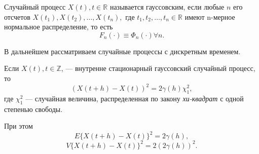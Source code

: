 \begin{Definition}
    Случайный процесс $ X(t), t \in \mathbb{R} $ называется гауссовским, если любые $ n $ его отсчетов $ X(t_1), X(t_2), \ldots, X(t_n), $ где $ t_1, t_2, \ldots, t_n \in \mathbb{R} $ имеют n-мерное нормальное распределение, то есть
	\begin{equation}
	    F_n(\cdot) \equiv \Phi_n(\cdot) \forall n.
	\end{equation}
\end{Definition}

В дальнейшем рассматриваем случайные процессы с дискретным временем.

\begin{Remark}
	Если $ X(t), t \in \mathbb{Z} $, --- внутренне стационарный гауссовский случайный процесс, то
	\begin{equation*}
		( X(t + h) - X(t) )^2 = 2 \gamma(h)\chi_1^2,
	\end{equation*}
	где $\chi_1^2$ --- случайная величина, распределенная по закону \textit{хи-квадрат} с одной степенью свободы.
\end{Remark}

При этом
\begin{equation}
\label{eq:E_diff_inc}
	E \{ X(t + h) - X(t) \}^2 = 2 \gamma(h),
\end{equation}
\begin{equation}
\label{eq:V_diff_inc}
	V \{ X(t + h) - X(t) \}^2 = 2 (2 \gamma(h))^2.
\end{equation}